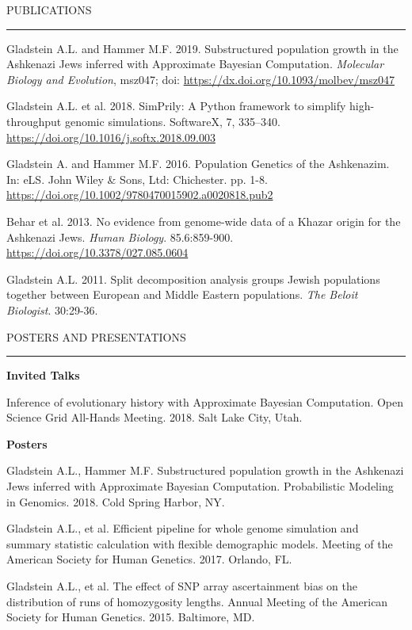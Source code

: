 \documentclass{resume} %
\renewenvironment{rSection}[1]{
\sectionskip
\textcolor{RoyalPurple}{\MakeUppercase{#1}}
\sectionlineskip
\hrule
\begin{list}{}{
\setlength{\leftmargin}{1.5em}
}
\item[]
}{
\end{list}
}
\begin{document}
\begin{rSection}{Publications}

\item Gladstein A.L. and Hammer M.F. 2019. Substructured population growth in the Ashkenazi Jews inferred with Approximate Bayesian Computation. \textit{Molecular Biology and Evolution}, msz047; doi: \url{https://dx.doi.org/10.1093/molbev/msz047}
\item Gladstein A.L. et al. 2018. SimPrily: A Python framework to simplify high-throughput genomic simulations. SoftwareX, 7, 335–340. \url{https://doi.org/10.1016/j.softx.2018.09.003}
\item Gladstein A. and Hammer M.F. 2016. Population Genetics of the Ashkenazim. In: eLS. John Wiley \& Sons, Ltd: Chichester. pp. 1-8. \url{https://doi.org/10.1002/9780470015902.a0020818.pub2}
\item Behar et al. 2013. No evidence from genome-wide data of a Khazar origin for the Ashkenazi Jews. \textit{Human Biology}. 85.6:859-900. \url{https://doi.org/10.3378/027.085.0604}
\item Gladstein A.L. 2011. Split decomposition analysis groups Jewish populations together between European and Middle Eastern populations. \textit{The Beloit Biologist}. 30:29-36.

\end{rSection}


\begin{rSection}{Posters and Presentations}

\textbf{Invited Talks}
\item Inference of evolutionary history with Approximate Bayesian Computation. Open Science Grid All-Hands Meeting. 2018. Salt Lake City, Utah.

\item

\textbf{Posters}
\item Gladstein A.L., Hammer M.F. Substructured population growth in the Ashkenazi Jews inferred with Approximate Bayesian Computation. Probabilistic Modeling in Genomics. 2018. Cold Spring Harbor, NY.

\item Gladstein A.L., et al. Efficient pipeline for whole genome simulation and summary statistic calculation with flexible demographic models. Meeting of the American Society for Human Genetics. 2017. Orlando, FL.

\item Gladstein A.L., et al. The effect of SNP array ascertainment bias on the distribution of runs of homozygosity lengths. Annual Meeting of the American Society for Human Genetics. 2015. Baltimore, MD. 


\end{rSection}
\end{document}
